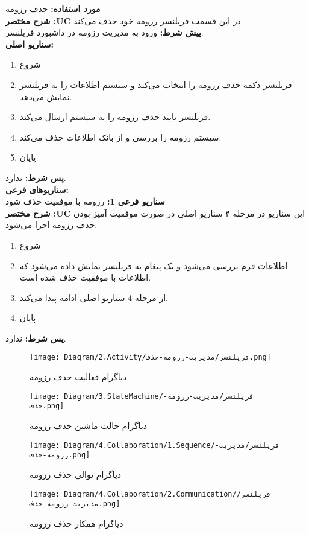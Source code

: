 \textbf{مورد استفاده:}
حذف رزومه
\\
\textbf{شرح مختصر :UC}
در این قسمت فریلنسر رزومه خود حذف می‌کند.
\\
\textbf{پيش شرط:}
ورود به مدیریت رزومه در داشبورد فریلنسر.
\\
\textbf{سناريو اصلی:}
\begin{enumerate}
	\item
	شروع
	\item
	فریلنسر دکمه حذف رزومه را انتخاب می‌کند و سیستم اطلاعات را به فریلنسر نمایش می‌دهد.
	\item
		فریلنسر تایید حذف رزومه را به سیستم ارسال می‌کند.
	\item
		سیستم رزومه را بررسی و از بانک اطلاعات حذف می‌کند.
	\item
	پایان
\end{enumerate}

\noindent
\textbf{پس شرط:}
ندارد.
\\
\textbf{سناريوهای فرعی:}
\\
\textbf{سناريو فرعی 1:}
رزومه با موفقیت حذف شود
\\
\textbf{شرح مختصر :UC}
این سناریو در مرحله ۴ سناریو اصلی در صورت موفقیت آمیز بودن حذف رزومه اجرا می‌شود.
\begin{enumerate}
	\item
	شروع
	\item
	اطلاعات فرم بررسی می‌شود و یک پیغام به فریلنسر نمایش داده می‌شود که اطلاعات با موفقیت حذف شده است.
	\item
	از مرحله 4 سناریو اصلی ادامه پیدا می‌کند.
	\item
	پایان
\end{enumerate}

\noindent
\textbf{پس شرط:}
ندارد.



\begin{figure}[H]
	\centering
	\texttt{[image: Diagram/2.Activity/فریلنسر/مدیریت-رزومه-حذف.png]}
	\caption{دیاگرام فعالیت حذف رزومه}
	\label{fig:a:حذف-رزومه}
\end{figure}
\begin{figure}[H]
	\centering
	\texttt{[image: Diagram/3.StateMachine/فریلنسر/مدیریت-رزومه-حذف.png]}
	\caption{دیاگرام حالت ماشین حذف رزومه}
	\label{fig:sm:حذف-رزومه}
\end{figure}
\begin{figure}[H]
	\centering
	\texttt{[image: Diagram/4.Collaboration/1.Sequence/فریلنسر/مدیریت-رزومه-حذف.png]}
	\caption{دیاگرام توالی حذف رزومه}
	\label{fig:s:حذف-رزومه}
\end{figure}
\begin{figure}[H]
	\centering
	\texttt{[image: Diagram/4.Collaboration/2.Communication/فریلنسر/مدیریت-رزومه-حذف.png]}
	\caption{دیاگرام همکار حذف رزومه}
	\label{fig:c:حذف-رزومه}
\end{figure}
